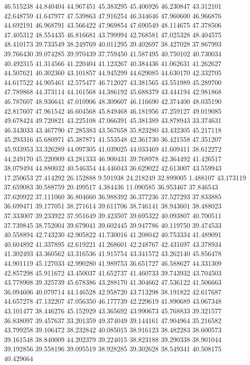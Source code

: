 46.515238
44.840404
44.967451
45.383295
45.406926
46.230847
43.312101
42.648759
41.647977
47.539863
47.916254
46.344646
47.960600
46.966876
44.692191
46.968791
43.566422
47.969854
47.690549
48.114675
47.378506
47.405312
48.554435
46.816681
43.799994
42.768581
47.025328
48.404575
48.410173
39.733549
38.249769
40.011295
39.402697
38.427028
37.867993
39.766430
39.074285
39.970439
37.759450
41.587495
40.750102
40.730034
40.492315
41.314566
41.220404
41.123267
40.384436
41.062631
41.262627
44.507621
40.302360
43.101857
44.945299
44.629085
44.630170
42.332705
44.617522
44.905461
42.575477
46.712027
43.381565
43.551989
45.289700
47.789868
44.373114
44.161568
44.386192
45.688379
43.444194
42.981868
46.787607
48.936641
47.010906
48.309607
46.116690
42.374400
48.035190
42.817607
47.961542
46.604568
45.849468
46.181956
47.259127
49.019085
49.678424
49.720821
43.225108
47.066391
45.381389
43.878943
33.374631
46.343033
43.467790
47.285383
43.567658
35.823280
43.432305
45.217118
45.293316
45.680971
45.387871
41.553548
42.361730
36.421558
47.351207
45.933953
33.326289
44.097305
41.039025
44.033469
41.609411
38.612272
44.249170
45.220909
43.281333
46.900431
39.768978
42.364492
41.426517
38.079494
44.880032
40.546354
44.446043
36.629022
42.613007
43.559943
17.250653
27.414292
26.152888
9.591938
24.218249
32.899005
1.488107
43.173119
37.659083
30.588759
20.499517
4.384436
11.090585
36.953467
37.846543
37.620922
37.111060
36.804660
36.988392
36.377236
37.527293
37.833885
36.699471
39.177051
38.271614
39.611706
38.746141
38.943601
38.488023
37.333007
39.233922
37.951649
39.423507
39.695322
40.093807
40.700511
37.739845
38.752004
39.679041
39.602445
39.947786
40.119750
39.474533
40.558894
42.743230
42.905822
41.730016
41.208042
40.753334
41.489091
40.604892
41.337895
42.619221
41.268601
42.248767
42.431697
43.378934
41.302493
43.360562
43.316536
41.915754
43.341572
43.262140
45.856478
44.901119
45.127033
42.990280
41.989753
36.651727
46.588627
44.331309
42.857298
45.911672
43.450037
41.652737
41.460733
39.743932
43.704503
43.778908
39.325739
45.678386
43.288170
41.304662
47.536122
41.506663
36.094606
40.079714
44.146528
42.958720
43.713298
38.191822
42.617687
44.657278
47.132207
47.056350
46.177739
42.229619
41.890689
43.067348
43.101477
38.446276
45.152929
43.365692
43.990673
45.768833
39.321577
36.838097
39.457637
33.201359
49.374049
39.144161
47.904964
35.216582
43.799258
39.106472
38.232842
40.085015
38.916123
38.482283
38.600573
39.161548
38.840009
44.202379
39.224015
38.823188
39.290338
38.901044
39.192856
39.558196
39.095519
38.928285
39.302628
38.549341
40.508175
40.429664
